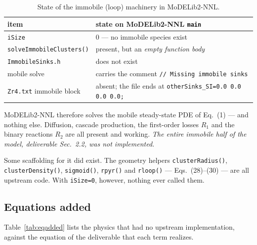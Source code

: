 \documentclass[11pt]{article}
\newcommand{\MoDnnl}{\textsf{MoDELib2-NNL}}
\newcommand{\code}[1]{\texttt{\small #1}}
\newcommand{\file}[1]{\texttt{\footnotesize #1}}
\newcommand{\dref}[1]{Eq.~(#1)}
\newcommand{\drefs}[2]{Eqs.~(#1)--(#2)}
\begin{document}
\begin{table}[htbp]
\centering
\caption{State of the immobile (loop) machinery in \MoDnnl{}.}
\label{tab:upstream}
\begin{tabular}{@{}ll@{}}
\toprule
item & state on \MoDnnl{} \file{main} \\
\midrule
\code{iSize} & $0$ --- no immobile species exist \\
\code{solveImmobileClusters()} & present, but an \emph{empty function body} \\
\code{ImmobileSinks.h} & does not exist \\
mobile solve & carries the comment \code{// Missing immobile sinks} \\
\file{Zr4.txt} immobile block & absent; the file ends at \code{otherSinks\_SI=0.0 0.0 0.0 0.0;} \\
\bottomrule
\end{tabular}
\end{table}

\noindent
\MoDnnl{} therefore solves the mobile steady-state PDE of \dref{1} --- and
nothing else. Diffusion, cascade production, the first-order losses $R_1$ and the
binary reactions $R_2$ are all present and working. \emph{The entire immobile
half of the model, deliverable Sec.~2.2, was not implemented.}

Some scaffolding for it did exist. The geometry helpers
\code{clusterRadius()}, \code{clusterDensity()}, \code{sigmoid()},
\code{rpyr()} and \code{rloop()} --- \drefs{28}{30} --- are all upstream code.
With \code{iSize=0}, however, nothing ever called them.

\subsection{Equations added}

Table~\ref{tab:eqadded} lists the physics that had no upstream implementation,
against the equation of the deliverable that each term realizes.
\end{document}
